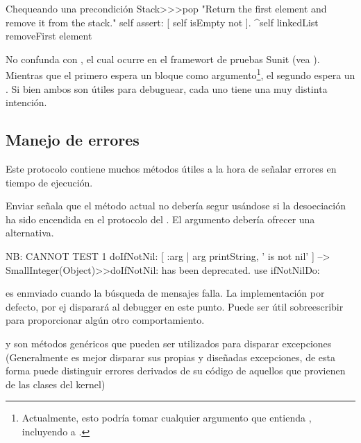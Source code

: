\documentclass[a4paper,10pt,twoside]{book}
\begin{document}
\begin{method}{Chequeando una precondici\'on}
Stack>>>pop
    "Return the first element and remove it from the stack."
    self assert: [ self isEmpty not ].
    ^self linkedList removeFirst element
\end{method}

No confunda  con , el cual ocurre en el framewort de pruebas Sunit (vea ). Mientras que el primero espera un bloque como argumento\footnote{Actualmente, esto podr\'ia tomar cualquier argumento que entienda , incluyendo a .}, el segundo espera un . Si bien ambos son \'utiles para debuguear, cada uno tiene una muy distinta intenci\'on.

\subsection{Manejo de errores}

 Este protocolo contiene muchos m\'etodos \'utiles a la hora de señalar errores en tiempo de ejecuci\'on.

Enviar   señala que el m\'etodo actual no deber\'ia segur us\'andose si la desoeciaci\'on ha sido encendida en el protocolo  del .
El argumento  deber\'ia ofrecer una alternativa.

\begin{code}{NB: CANNOT TEST}
1 doIfNotNil: [ :arg | arg printString, ' is not nil' ]
	--> SmallInteger(Object)>>doIfNotNil: has been deprecated. use ifNotNilDo:
\end{code}

 es enmviado cuando la b\'usqueda de mensajes falla. La implementaci\'on por defecto, por ej   disparar\'a al debugger en este punto. Puede ser \'util sobreescribir   para proporcionar alg\'un otro comportamiento.


 y  son m\'etodos gen\'ericos que pueden ser utilizados para disparar excepciones (Generalmente es mejor disparar sus propias y diseñadas excepciones, de esta forma puede distinguir errores derivados de su c\'odigo de aquellos que provienen de las clases del kernel)
\end{document}
